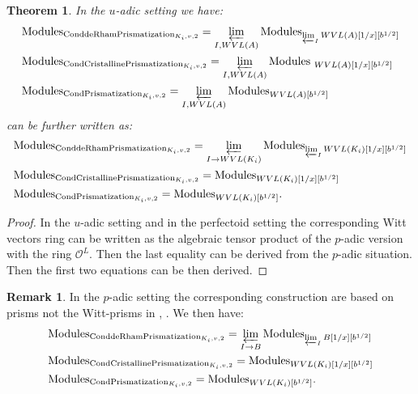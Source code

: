 \documentclass[12pt]{article}
\newtheorem{theorem}{Theorem}
\theoremstyle{definition}
\newtheorem{remark}{Remark}
\begin{document}
\begin{theorem}
In the $u$-adic setting we have:
\begin{align}
&\mathrm{Modules}_{\mathrm{ConddeRhamPrismatization}_{K_i,v,2}}=\varprojlim_{{I,WVL(A)}} \mathrm{Modules}_{\varprojlim_{I}WVL(A)[1/x][b^{1/2}]}\\
&\mathrm{Modules}_{\mathrm{CondCristallinePrismatization}_{K_i,v,2}}=\varprojlim_{{I,WVL(A)}} \mathrm{Modules}_{\ WVL(A)[1/x][b^{1/2}]}\\
&\mathrm{Modules}_{\mathrm{CondPrismatization}_{K_i,v,2}}=\varprojlim_{{I,WVL(A)}} \mathrm{Modules}_{WVL(A)[b^{1/2}]}
\end{align}
can be further written as:
\begin{align}
&\mathrm{Modules}_{\mathrm{ConddeRhamPrismatization}_{K_i,v,2}}=\varprojlim_{{I\rightarrow WVL(K_i)}} \mathrm{Modules}_{\varprojlim_{I}WVL(K_i)[1/x][b^{1/2}]}\\
&\mathrm{Modules}_{\mathrm{CondCristallinePrismatization}_{K_i,v,2}}=\mathrm{Modules}_{ WVL(K_i)[1/x][b^{1/2}]}\\
&\mathrm{Modules}_{\mathrm{CondPrismatization}_{K_i,v,2}}=\mathrm{Modules}_{WVL(K_i)[b^{1/2}]}.
\end{align}
\end{theorem}

\begin{proof}
In the $u$-adic setting and in the perfectoid setting the corresponding Witt vectors ring can be written as the algebraic tensor product of the $p$-adic version with the ring $\mathcal{O}^L$. Then the last equality can be derived from the $p$-adic situation. Then the first two equations can be then derived.
\end{proof}

\begin{remark}
In the $p$-adic setting the corresponding construction are based on prisms not the Witt-prisms in \cite{1BL}, \cite{1D}. We then have:
\begin{align}
&\mathrm{Modules}_{\mathrm{ConddeRhamPrismatization}_{K_i,v,2}}=\varprojlim_{{I\rightarrow B}} \mathrm{Modules}_{\varprojlim_{I}B[1/x][b^{1/2}]}\\
&\mathrm{Modules}_{\mathrm{CondCristallinePrismatization}_{K_i,v,2}}=\mathrm{Modules}_{ WVL(K_i)[1/x][b^{1/2}]}\\
&\mathrm{Modules}_{\mathrm{CondPrismatization}_{K_i,v,2}}=\mathrm{Modules}_{WVL(K_i)[b^{1/2}]}.
\end{align}
\end{remark}
\end{document}
